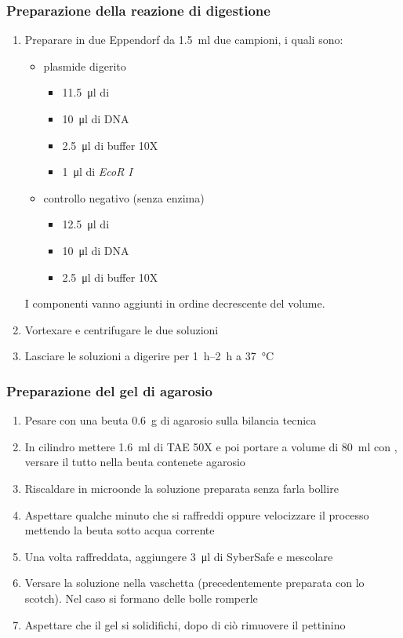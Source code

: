 \subsubsection{Preparazione della reazione di digestione}
\begin{enumerate}
	\item Preparare in due \foreignlanguage{german}{Eppendorf} da \qty{1.5}{\ml} due campioni, i quali sono:
	\begin{itemize}
		\item plasmide digerito
		\begin{itemize}
			\item \qty{11.5}{\micro\litre} di 
			\item \qty{10}{\micro\litre} di DNA
			\item \qty{2.5}{\micro\litre} di buffer 10X
			\item \qty{1}{\micro\litre} di \emph{EcoR I}
		\end{itemize}
		\item controllo negativo (senza enzima)
		\begin{itemize}
			\item \qty{12.5}{\micro\litre} di 
			\item \qty{10}{\micro\litre} di DNA
			\item \qty{2.5}{\micro\litre} di buffer 10X
		\end{itemize}
	\end{itemize}
	I componenti vanno aggiunti in ordine decrescente del volume.
	\item Vortexare e centrifugare le due soluzioni
	\item Lasciare le soluzioni a digerire per \qtyrange{1}{2}{\hour} a \qty{37}{\celsius}
\end{enumerate}
\subsubsection{Preparazione del gel di agarosio}
\begin{enumerate}
	\item Pesare con una beuta \qty{0.6}{\g} di agarosio sulla bilancia tecnica 
	\item In cilindro mettere \qty{1.6}{\ml} di TAE 50X e poi portare a volume di \qty{80}{\ml} con , versare il tutto nella beuta contenete agarosio
	\item Riscaldare in microonde la soluzione preparata senza farla bollire
	\item Aspettare qualche minuto che si raffreddi oppure velocizzare il processo mettendo la beuta sotto acqua corrente
	\item Una volta raffreddata, aggiungere \qty{3}{\micro\litre} di SyberSafe e mescolare
	\item Versare la soluzione nella vaschetta (precedentemente preparata con lo scotch). Nel caso si formano delle bolle romperle
	\item Aspettare che il gel si solidifichi, dopo di ciò rimuovere il pettinino
\end{enumerate}

